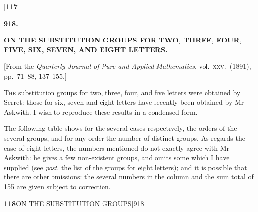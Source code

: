 \documentclass[11pt]{article}
\begin{document}
\newpage
{}]\hfill\hfill\textbf{117}

\vspace{2em}
\begin{center}\large\textbf{918.}\end{center}
\vspace{1em}
\begin{center}\large\textbf{ON THE SUBSTITUTION GROUPS FOR TWO, THREE, FOUR,\\
FIVE, SIX, SEVEN, AND EIGHT LETTERS.}\end{center}
\vspace{0.5em}
\begin{center}\small[From the \emph{Quarterly Journal of Pure and Applied Mathematics},
vol.\ \textsc{xxv}.\ (1891),\\
pp.\ 71--88, 137--155.]\end{center}
\vspace{1em}

\hspace{1em} T\textsc{he} substitution groups for two, three, four, and five
letters were obtained by Serret: those for six, seven and eight letters have
recently been obtained by Mr Askwith. I wish to reproduce these results in a
condensed form.

\hspace{1em} The following table shows for the several cases respectively,
the orders of the several groups, and for any order the number of distinct
groups. As regards the case of eight letters, the numbers mentioned do not
exactly agree with Mr Askwith: he gives a few non-existent groups, and omits
some which I have supplied (see \emph{post}, the list of the groups for
eight letters); and it is possible that there are other omissions: the
several numbers in the column and the sum total of 155 are given subject to
correction.

\newpage
\noindent\textbf{118}\hfill ON THE SUBSTITUTION GROUPS\hfill[918

\smallskip
\end{document}
